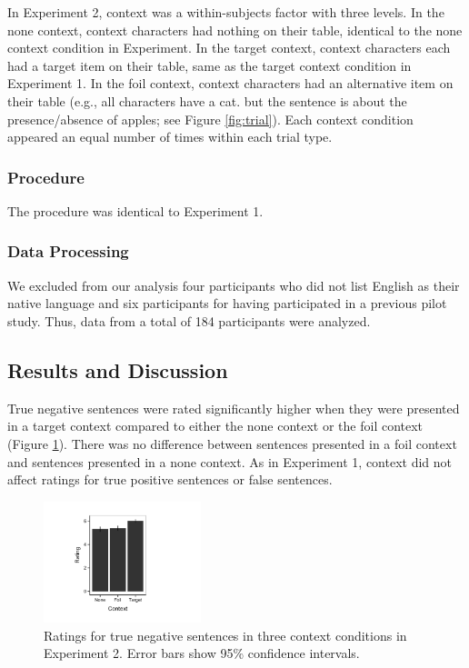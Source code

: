 \documentclass[10pt,letterpaper]{article}
\begin{document}
In Experiment 2, context was a within-subjects factor with three levels. In the none context, context characters had nothing on their table, identical to the none context condition in Experiment. In the target context, context characters each had a target item on their table, same as the target context condition in Experiment 1. In the foil context, context characters had an alternative item on their table (e.g., all characters have a cat. but the sentence is about the presence/absence of apples; see Figure \ref{fig:trial}).  Each context condition appeared an equal number of times within each trial type.  

\subsubsection{Procedure}

The procedure was identical to Experiment 1.

\subsubsection{Data Processing}

We excluded from our analysis four participants who did not list English as their native language and six participants for having participated in a previous pilot study.  Thus, data from a total of 184 participants were analyzed.  

\subsection{Results and Discussion}

True negative sentences were rated significantly higher when they were presented in a target context compared to either the none context or the foil context (Figure \ref{fig:s2}).  There was no difference between sentences presented in a foil context and sentences presented in a none context.  As in Experiment 1, context did not affect ratings for true positive sentences or false sentences.  

\begin{figure}
\begin{center} 
\includegraphics[width=1.8in]{figures/study2.pdf}
\caption{\label{fig:s2} Ratings for true negative sentences in three context conditions in Experiment 2.  Error bars show 95\% confidence intervals.}
\end{center} 
\end{figure}
\end{document}
